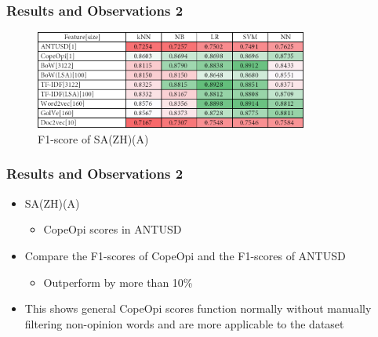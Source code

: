 \documentclass[mathserif]{beamer}
\begin{document}
\begin{frame}
\frametitle{Results and Observations 2}
	\begin{figure}
	\centering
	\caption{F1-score of SA(ZH)(A)}
	\includegraphics[width=0.8\textwidth]{./figure/02A1.png}
	\end{figure}
\end{frame}
\begin{frame}
\frametitle{Results and Observations 2}
	\begin{itemize}
	\item SA(ZH)(A)
		\begin{itemize}
		\item CopeOpi scores in ANTUSD
		\end{itemize}
	\item Compare the F1-scores of CopeOpi and the F1-scores of ANTUSD
		\begin{itemize}
		\item Outperform by more than 10\%
		\end{itemize}
	\item This shows general CopeOpi scores function normally without manually filtering non-opinion words and are more applicable to the dataset
	\end{itemize}
\end{frame}
\end{document}
